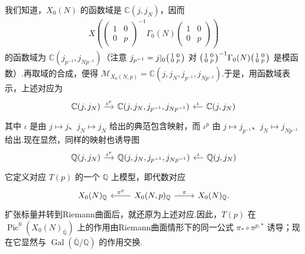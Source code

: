 我们知道，$X_0(N)$ 的函数域是 $\mathbb C(j,j_N)$，因而
\begin{align*}
X\left(\begin{pmatrix}1&0\\0&p\end{pmatrix}^{-1}\Gamma_0(N)\begin{pmatrix}1&0\\0&p\end{pmatrix}\right)
\end{align*}
的函数域为 $\mathbb C(j_{p^{-1}},j_{Np^{-1}})$（注意 $j_{p^{-1}}=j|_0\begin{psmallmatrix}1&0\\0&p\end{psmallmatrix}$ 对 $\begin{psmallmatrix}1&0\\0&p\end{psmallmatrix}^{-1}\Gamma_0(N)\begin{psmallmatrix}1&0\\0&p\end{psmallmatrix}$ 是模函数）.再取域的合成，便得 $\mathcal M_{X_0(N,p)}=\mathbb C(j,j_N,j_{p^{-1}},j_{Np^{-1}})$.于是，用函数域表示，上述对应为
\begin{equation*}
\begin{tikzcd}[column sep=small]
\mathbb C(j,j_N) \arrow[r,"\iota^p"] & \mathbb C(j,j_N,j_{p^{-1}},j_{Np^{-1}}) & \mathbb C(j,j_N) \arrow[l,"\iota"']
\end{tikzcd}
\end{equation*}
其中 $\iota$ 是由 $j\mapsto j$、$j_N\mapsto j_N$ 给出的典范包含映射，而 $\iota^p$ 由 $j\mapsto j_{p^{-1}}$、$j_N\mapsto j_{Np^{-1}}$ 给出.现在显然，同样的映射也诱导图
\begin{equation*}
\begin{tikzcd}[column sep=small]
\mathbb Q(j,j_N) \arrow[r,"\iota^p"] & \mathbb Q(j,j_N,j_{p^{-1}},j_{Np^{-1}}) & \mathbb Q(j,j_N) \arrow[l,"\iota"']
\end{tikzcd}
\end{equation*}
它定义对应 $T(p)$ 的一个 $\mathbb Q$ 上模型，即代数对应
\begin{equation*}
\begin{tikzcd}
X_0(N)_{\mathbb Q} & X_0(N,p)_{\mathbb Q} \arrow[l,"\pi^p"'] \arrow[r,"\pi"] & X_0(N)_{\mathbb Q}.
\end{tikzcd}
\end{equation*}
扩张标量并转到Riemann曲面后，就还原为上述对应.因此，$T(p)$ 在 $\operatorname{Pic}^0(X_0(N)_{\overline{\mathbb Q}})$ 上的作用由Riemann曲面情形下的同一公式 $\pi_*\circ\pi^{p,*}$ 诱导；现在它显然与 $\operatorname{Gal}(\overline{\mathbb Q}/\mathbb Q)$ 的作用交换.

